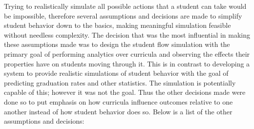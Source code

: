 \documentclass[botnum, fleqn]{unmeethesis}
\begin{document}
    Trying to realistically simulate all possible actions that a student can take would be impossible, therefore several assumptions and decisions are made to simplify student behavior down to the basics, making meaningful simulation feasible without needless complexity. The decision that was the most influential in making these assumptions made was to design the student flow simulation with the primary goal of performing analytics over curricula and observing the effects their properties have on students moving through it. This is in contrast to developing a system to provide realistic simulations of student behavior with the goal of predicting graduation rates and other statistics. The simulation is potentially capable of this; however it was not the goal. Thus the other decisions made were done so to put emphasis on how curricula influence outcomes relative to one another instead of how student behavior does so. Below is a list of the other assumptions and decisions:
\end{document}
